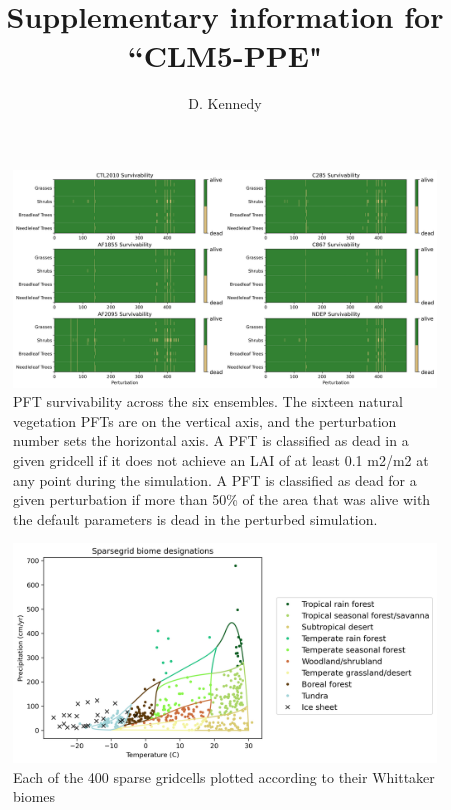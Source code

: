\documentclass[11pt]{article}
\title{Supplementary information for ``CLM5-PPE"}
\author{D. Kennedy}
\begin{document}
\maketitle


\begin{landscape}
\begin{figure}[h]
\centering
\includegraphics[width=50pc]{figs/supp/survivability.png}
\caption{PFT survivability across the six ensembles. The sixteen natural vegetation PFTs are on the vertical axis, and the perturbation number sets the horizontal axis. A PFT is classified as dead in a given gridcell if it does not achieve an LAI of at least 0.1 m2/m2 at any point during the simulation. A PFT is classified as dead for a given perturbation if more than 50\% of the area that was alive with the default parameters is dead in the perturbed simulation.}
\label{supp:surv}
\end{figure}
\end{landscape}

\begin{figure}[h]
\centering
\includegraphics[width=40pc]{figs/supp/biome_tp.png}
\caption{Each of the 400 sparse gridcells plotted according to their Whittaker biomes}
\label{supp:whit1}
\end{figure}
\end{document}
